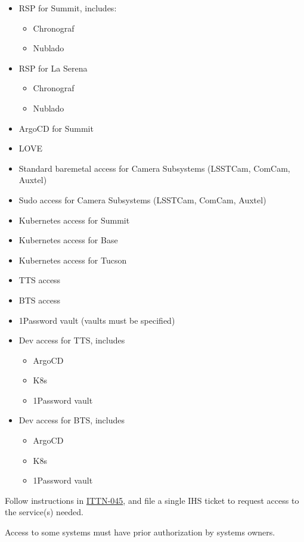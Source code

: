 \begin{itemize}
  \item RSP for Summit, includes:
  \begin{itemize}
    \item Chronograf
    \item Nublado
  \end{itemize}
  \item RSP for La Serena
  \begin{itemize}
    \item Chronograf
    \item Nublado
  \end{itemize}
  \item ArgoCD for Summit
  \item LOVE
  \item Standard baremetal access for Camera Subsystems (LSSTCam, ComCam, Auxtel)
  \item Sudo access for Camera Subsystems (LSSTCam, ComCam, Auxtel)
  \item Kubernetes access for Summit
  \item Kubernetes access for Base
  \item Kubernetes access for Tucson
  \item TTS access
  \item BTS access
  \item 1Password vault (vaults must be specified)
  \item Dev access for TTS, includes
  \begin{itemize}
    \item ArgoCD
    \item K8s
    \item 1Password vault
  \end{itemize}
  \item Dev access for BTS, includes
  \begin{itemize}
    \item ArgoCD
    \item K8s
    \item 1Password vault
  \end{itemize}

\end{itemize}

Follow instructions in \href{https://ittn-045.lsst.io}{ITTN-045}, and file a single IHS ticket to request access to the service(s) needed. 

Access to some systems must have prior authorization by systems owners.

